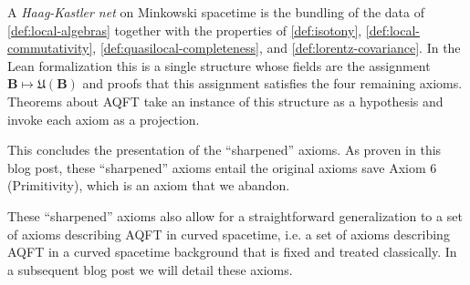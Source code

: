 \begin{definition}
    \label{def:haag-kastler-net}
    \leanok
    A \emph{Haag-Kastler net} on Minkowski spacetime is the bundling of the data of \cref{def:local-algebras} together with the properties of \cref{def:isotony}, \cref{def:local-commutativity}, \cref{def:quasilocal-completeness}, and \cref{def:lorentz-covariance}. In the Lean formalization this is a single structure whose fields are the assignment $\mathbf{B} \mapsto \mathfrak{U}(\mathbf{B})$ and proofs that this assignment satisfies the four remaining axioms. Theorems about AQFT take an instance of this structure as a hypothesis and invoke each axiom as a projection.
\end{definition}

This concludes the presentation of the ``sharpened'' axioms. As proven in this blog post, these ``sharpened'' axioms entail the original axioms save Axiom 6 (Primitivity), which is an axiom that we abandon.

These ``sharpened'' axioms also allow for a straightforward generalization to a set of axioms describing AQFT in curved spacetime, i.e. a set of axioms describing AQFT in a curved spacetime background that is fixed and treated classically. In a subsequent blog post we will detail these axioms.

